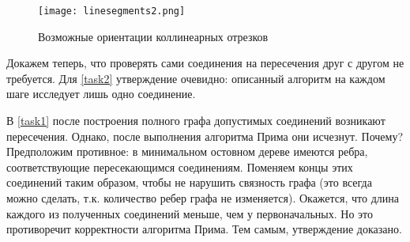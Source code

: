 \begin{figure}[!h]
    \centering
    \texttt{[image: linesegments2.png]}
    \caption{Возможные ориентации коллинеарных отрезков}
    \label{fig:segments2}
\end{figure}

Докажем теперь, что проверять сами соединения на пересечения друг с другом не требуется. Для \ref{task2} утверждение очевидно: описанный алгоритм на каждом шаге исследует лишь одно соединение.

В \ref{task1} после построения полного графа допустимых соединений возникают пересечения. Однако, после выполнения алгоритма Прима они исчезнут. Почему? Предположим противное: в минимальном остовном дереве имеются ребра, соответствующие пересекающимся соединениям. Поменяем концы этих соединений таким образом, чтобы не нарушить связность графа (это всегда можно сделать, т.к. количество ребер графа не изменяется). Окажется, что длина каждого из полученных соединений меньше, чем у первоначальных. Но это противоречит корректности алгоритма Прима. Тем самым, утверждение доказано.